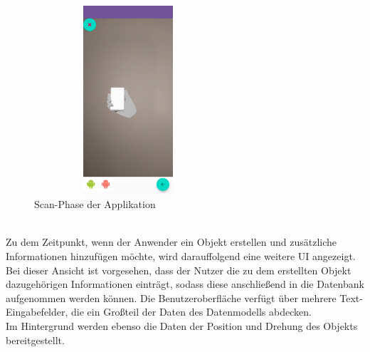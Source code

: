 \begin{figure}[hbt!]
    \centering
    \includegraphics[width=7cm,height=7cm,keepaspectratio]{4Umsetzung/Bilder/scan-phase.jpg}
    \caption{Scan-Phase der Applikation}
    \label{pic:scan}
\end{figure}
\pagebreak
\\ %
Zu dem Zeitpunkt, wenn der Anwender ein Objekt erstellen und zusätzliche Informationen hinzufügen möchte, wird darauffolgend eine weitere \acs{UI} 
angezeigt. Bei dieser Ansicht ist vorgesehen, dass der Nutzer die zu dem erstellten Objekt dazugehörigen Informationen einträgt, sodass diese anschließend 
in die Datenbank aufgenommen werden können. Die Benutzeroberfläche verfügt über mehrere Text-Eingabefelder, die ein Großteil der Daten des Datenmodells 
abdecken. %
\\ 
Im Hintergrund werden ebenso die Daten der Position und Drehung des 
Objekts bereitgestellt. %
